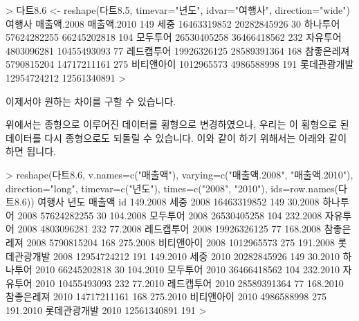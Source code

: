 \begin{Schunk}
\begin{Soutput}
> 다트8.6 <- reshape(다트8.5, timevar="년도", idvar="여행사", direction="wide")
          여행사 매출액.2008 매출액.2010
149         세중 16463319852 20282845926
30      하나투어 57624282255 66245202818
104     모두투어 26530405258 36466418562
232     자유투어  4803096281 10455493093
77    레드캡투어 19926326125 28589391364
168   참좋은레져  5790815204 14717211161
275   비티앤아이  1012965573  4986588998
191 롯데관광개발 12954724212 12561340891
> 
\end{Soutput}
\end{Schunk}

이제서야 원하는 차이를 구할 수 있습니다.

\begin{Schunk}
\end{Schunk}

위에서는 종형으로 이루어진 데이터를 횡형으로 변경하였으나, 우리는 이 횡형으로 된 데이터를 다시 종형으로도 되돌릴 수 있습니다. 
이와 같이 하기 위해서는 아래와 같이 하면 됩니다.

\begin{Schunk}
\begin{Soutput}
> reshape(다트8.6,  v.names=c("매출액"), varying=c("매출액.2008", "매출액.2010"), direction="long", timevar=c("년도"), times=c("2008", "2010"), ids=row.names(다트8.6))
               여행사 년도      매출액  id
149.2008         세중 2008 16463319852 149
30.2008      하나투어 2008 57624282255  30
104.2008     모두투어 2008 26530405258 104
232.2008     자유투어 2008  4803096281 232
77.2008    레드캡투어 2008 19926326125  77
168.2008   참좋은레져 2008  5790815204 168
275.2008   비티앤아이 2008  1012965573 275
191.2008 롯데관광개발 2008 12954724212 191
149.2010         세중 2010 20282845926 149
30.2010      하나투어 2010 66245202818  30
104.2010     모두투어 2010 36466418562 104
232.2010     자유투어 2010 10455493093 232
77.2010    레드캡투어 2010 28589391364  77
168.2010   참좋은레져 2010 14717211161 168
275.2010   비티앤아이 2010  4986588998 275
191.2010 롯데관광개발 2010 12561340891 191
> 
\end{Soutput}
\end{Schunk}


